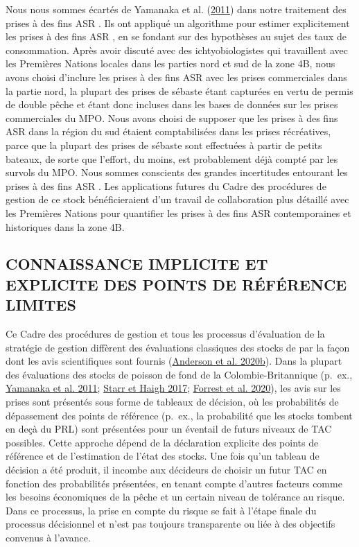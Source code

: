 \documentclass[french,11pt]{book}
\begin{document}
Nous nous sommes écartés de Yamanaka et al. (\protect\hyperlink{ref-yamanaka2011}{2011}) dans notre traitement des prises à des fins ASR . Ils ont appliqué un algorithme pour estimer explicitement les prises à des fins ASR , en se fondant sur des hypothèses au sujet des taux de consommation. Après avoir discuté avec des ichtyobiologistes qui travaillent avec les Premières Nations locales dans les parties nord et sud de la zone 4B, nous avons choisi d'inclure les prises à des fins ASR avec les prises commerciales dans la partie nord, la plupart des prises de sébaste étant capturées en vertu de permis de double pêche et étant donc incluses dans les bases de données sur les prises commerciales du MPO. Nous avons choisi de supposer que les prises à des fins ASR dans la région du sud étaient comptabilisées dans les prises récréatives, parce que la plupart des prises de sébaste sont effectuées à partir de petits bateaux, de sorte que l'effort, du moins, est probablement déjà compté par les survols du MPO. Nous sommes conscients des grandes incertitudes entourant les prises à des fins ASR . Les applications futures du Cadre des procédures de gestion de ce stock bénéficieraient d'un travail de collaboration plus détaillé avec les Premières Nations pour quantifier les prises à des fins ASR contemporaines et historiques dans la zone 4B.

\hypertarget{sec:discussion-implicit}{%
\subsection{CONNAISSANCE IMPLICITE ET EXPLICITE DES POINTS DE RÉFÉRENCE LIMITES}\label{sec:discussion-implicit}}

Ce Cadre des procédures de gestion et tous les processus d'évaluation de la stratégie de gestion diffèrent des évaluations classiques des stocks de par la façon dont les avis scientifiques sont fournis (\protect\hyperlink{ref-anderson2020gfmp}{Anderson et al. 2020b}). Dans la plupart des évaluations des stocks de poisson de fond de la Colombie-Britannique (p.~ex., \protect\hyperlink{ref-yamanaka2011}{Yamanaka et al. 2011}; \protect\hyperlink{ref-starr2017}{Starr et Haigh 2017}; \protect\hyperlink{ref-forrest2019}{Forrest et al. 2020}), les avis sur les prises sont présentés sous forme de tableaux de décision, où les probabilités de dépassement des points de référence (p.~ex., la probabilité que les stocks tombent en deçà du PRL) sont présentées pour un éventail de futurs niveaux de TAC possibles. Cette approche dépend de la déclaration explicite des points de référence et de l'estimation de l'état des stocks. Une fois qu'un tableau de décision a été produit, il incombe aux décideurs de choisir un futur TAC en fonction des probabilités présentées, en tenant compte d'autres facteurs comme les besoins économiques de la pêche et un certain niveau de tolérance au risque. Dans ce processus, la prise en compte du risque se fait à l'étape finale du processus décisionnel et n'est pas toujours transparente ou liée à des objectifs convenus à l'avance.
\end{document}

